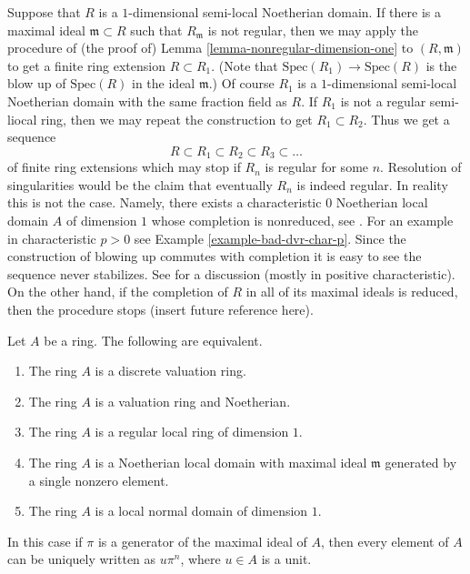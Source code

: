 \begin{remark}
\label{remark-resolution-dim-1}
Suppose that $R$ is a $1$-dimensional semi-local Noetherian domain.
If there is a maximal ideal $\mathfrak m \subset R$ such that
$R_{\mathfrak m}$ is not regular, then we may apply the procedure of
(the proof of) Lemma \ref{lemma-nonregular-dimension-one} to $(R, \mathfrak m)$
to get a finite ring extension $R \subset R_1$.
(Note that $\text{Spec}(R_1) \to \text{Spec}(R)$ is the blow up
of $\text{Spec}(R)$ in the ideal $\mathfrak m$.) Of course $R_1$ is
a $1$-dimensional semi-local Noetherian domain with the same fraction
field as $R$. If $R_1$ is not a regular semi-liocal ring, then
we may repeat the construction to get $R_1 \subset R_2$.
Thus we get a sequence
$$
R \subset R_1 \subset R_2 \subset R_3 \subset \ldots
$$
of finite ring extensions which may stop if $R_n$ is regular for
some $n$. Resolution of singularities would be the claim
that eventually $R_n$ is indeed regular. In reality this is not
the case. Namely, there exists a characteristic $0$
Noetherian local domain $A$ of dimension $1$ whose completion is nonreduced,
see \cite[Proposition 3.1]{Ferrand-Raynaud}.
For an example in characteristic $p > 0$ see
Example \ref{example-bad-dvr-char-p}.
Since the construction of blowing up commutes with completion it
is easy to see the sequence never stabilizes.
See \cite{Bennett} for a discussion (mostly in positive characteristic).
On the other hand, if the completion of $R$ in all of its maximal
ideals is reduced, then the procedure stops (insert future reference
here).
\end{remark}

\begin{lemma}
\label{lemma-characterize-dvr}
Let $A$ be a ring. The following are equivalent.
\begin{enumerate}
\item The ring $A$ is a discrete valuation ring.
\item The ring $A$ is a valuation ring and Noetherian.
\item The ring $A$ is a regular local ring of dimension $1$.
\item The ring $A$ is a Noetherian local domain with maximal ideal
$\mathfrak m$ generated by a single nonzero element.
\item The ring $A$ is a local normal domain of dimension $1$.
\end{enumerate}
In this case if $\pi$ is a generator of the maximal ideal of
$A$, then every element of $A$ can be uniquely written as
$u\pi^n$, where $u \in A$ is a unit.
\end{lemma}

